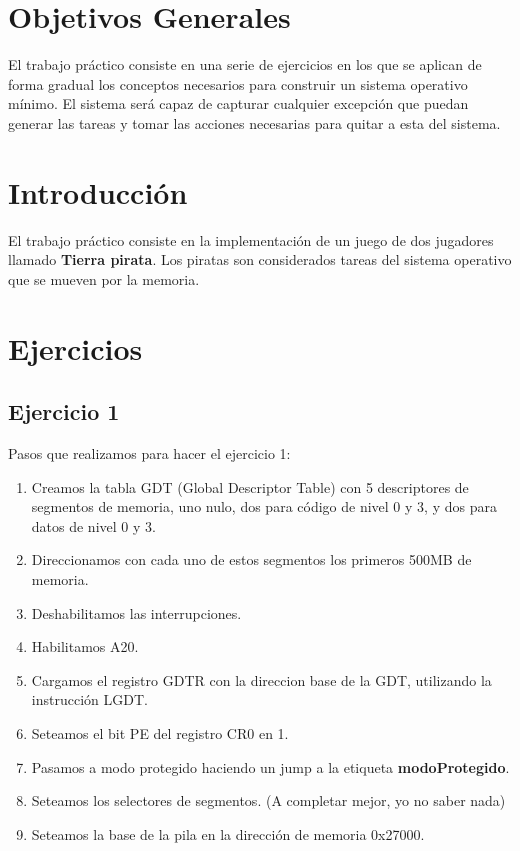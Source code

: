 \documentclass[a4paper,10pt]{article}
\begin{document}
\thispagestyle{empty}

\maketitle
\newpage

\section{Objetivos Generales}
El trabajo práctico consiste en una serie de ejercicios en los que se aplican de forma gradual los conceptos necesarios para construir un sistema operativo mínimo.
El sistema será capaz de capturar cualquier excepción que puedan generar las tareas y tomar las acciones necesarias para quitar a esta del sistema.

\section{Introducción}
El trabajo práctico consiste en la implementación de un juego de dos jugadores llamado \textbf{Tierra pirata}.
Los piratas son considerados tareas del sistema operativo que se mueven por la memoria.

\section{Ejercicios}

\subsection{Ejercicio 1}
Pasos que realizamos para hacer el ejercicio 1:
\begin{enumerate}
  \item Creamos la tabla GDT (Global Descriptor Table) con 5 descriptores de segmentos de memoria, uno nulo, dos para código de nivel 0 y 3, y dos para datos de nivel 0 y 3.
  \item Direccionamos con cada uno de estos segmentos los primeros 500MB de memoria.
  \item Deshabilitamos las interrupciones.
  \item Habilitamos A20.
  \item Cargamos el registro GDTR con la direccion base de la GDT, utilizando la instrucción LGDT.
  \item Seteamos el bit PE del registro CR0 en 1.
  \item Pasamos a modo protegido haciendo un jump a la etiqueta \textbf{modoProtegido}.
  \item Seteamos los selectores de segmentos. (A completar mejor, yo no saber nada)
  \item Seteamos la base de la pila en la dirección de memoria 0x27000.
\end{enumerate}
\end{document}
